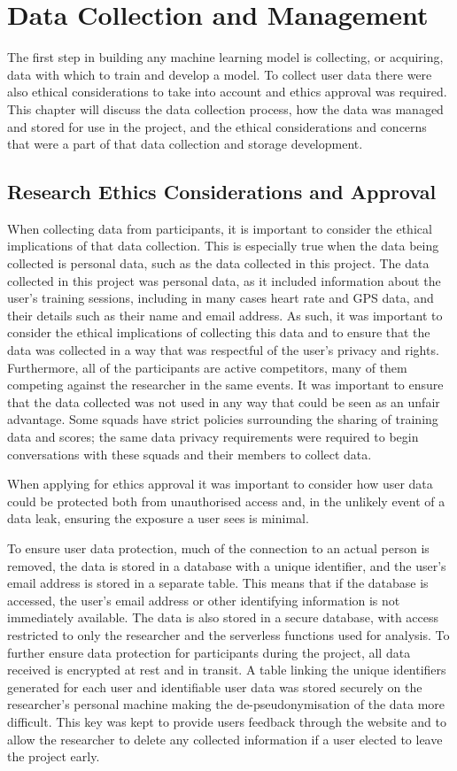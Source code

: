 \chapter{\label{ch:data-collect-mng}Data Collection and Management}
The first step in building any machine learning model is collecting, or acquiring, data with which to train and develop a model. To collect user data there were also ethical considerations to take into account and ethics approval was required. This chapter will discuss the data collection process, how the data was managed and stored for use in the project, and the ethical considerations and concerns that were a part of that data collection and storage development.

\section{Research Ethics Considerations and Approval}
When collecting data from participants, it is important to consider the ethical implications of that data collection. This is especially true when the data being collected is personal data, such as the data collected in this project. The data collected in this project was personal data, as it included information about the user's training sessions, including in many cases heart rate and GPS data, and their details such as their name and email address. As such, it was important to consider the ethical implications of collecting this data and to ensure that the data was collected in a way that was respectful of the user's privacy and rights. Furthermore, all of the participants are active competitors, many of them competing against the researcher in the same events. It was important to ensure that the data collected was not used in any way that could be seen as an unfair advantage. Some squads have strict policies surrounding the sharing of training data and scores; the same data privacy requirements were required to begin conversations with these squads and their members to collect data. 

When applying for ethics approval it was important to consider how user data could be protected both from unauthorised access and, in the unlikely event of a data leak, ensuring the exposure a user sees is minimal.

To ensure user data protection, much of the connection to an actual person is removed, the data is stored in a database with a unique identifier, and the user's email address is stored in a separate table. This means that if the database is accessed, the user's email address or other identifying information is not immediately available. The data is also stored in a secure database, with access restricted to only the researcher and the serverless functions used for analysis. To further ensure data protection for participants during the project, all data received is encrypted at rest and in transit. A table linking the unique identifiers generated for each user and identifiable user data was stored securely on the researcher's personal machine making the de-pseudonymisation of the data more difficult. This key was kept to provide users feedback through the website and to allow the researcher to delete any collected information if a user elected to leave the project early.


